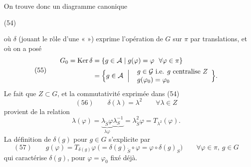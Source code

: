 \documentclass[11pt,a4paper]{article}
\begin{document}
On trouve donc un diagramme canonique

(54)


où $\delta$ (jouant le rôle d'une «  ») exprime l'opération de $G$ sur $\pi$ par translations, et où on a posé
\[
(55) \qquad
\begin{aligned}
G_0 = \mathrm{Ker}\,\delta &= \{g \in \mathcal{A} \mid g(\varphi) = \varphi \ \ \forall \varphi \in \pi\} \\
&= \Bigl\{ g \in \mathcal{A} \ \Bigm|\ 
\begin{array}{l}
g \in \mathcal{G} \text{ i.e. } g \text{ centralise } Z \\
g(\varphi_0) = \varphi_0
\end{array}
\Bigr\} .
\end{aligned}
\]
Le fait que $Z \subset G$, et la commutativité exprimée dans (54)
\[
(56) \qquad \delta(\lambda) = \lambda^{2} \qquad \forall \lambda \in Z
\]
provient de la relation
\[
\lambda(\varphi) = \underbrace{\lambda_{\check{S}} \varphi}_{\lambda \varphi} \underbrace{\lambda_S^{-1}}_{} = \lambda_{\check{S}}^{2} \varphi = T_{\lambda^{2}}(\varphi) .
\]
La définition de $\delta(g)$ pour $g \in G$ s'explicite par
\[
(57) \qquad g(\varphi) = T_{\delta(g)} \varphi \ \bigl(= \delta(g)_{\check{S}} \circ \varphi = \varphi \circ \delta(g)_S\bigr) \qquad \forall \varphi \in \pi,\ g \in G
\]
qui caractérise $\delta(g)$, pour   $\varphi = \varphi_0$ fixé déjà.
\end{document}
